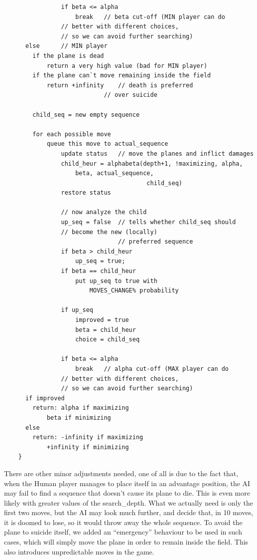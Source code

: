 {\begin{lstlisting}
                if beta <= alpha
                	break	// beta cut-off (MIN player can do
				// better with different choices,
				// so we can avoid further searching)
      else		// MIN player
      	if the plane is dead
        	return a very high value (bad for MIN player)
        if the plane can`t move remaining inside the field
        	return +infinity	// death is preferred
                			// over suicide
        
        child_seq = new empty sequence
        
        for each possible move
        	queue this move to actual_sequence
                update status	// move the planes and inflict damages
                child_heur = alphabeta(depth+1, !maximizing, alpha,
					beta, actual_sequence,
                                        child_seq)
                restore status
        	
                // now analyze the child
                up_seq = false	// tells whether child_seq should
				// become the new (locally)
                                // preferred sequence
                if beta > child_heur
                	up_seq = true;
                if beta == child_heur
                	put up_seq to true with
                        MOVES_CHANGE% probability
                        
                if up_seq
                	improved = true
                	beta = child_heur
                	choice = child_seq
                
                if beta <= alpha
                	break	// alpha cut-off (MAX player can do
				// better with different choices,
				// so we can avoid further searching)
      if improved
      	return:	alpha if maximizing
        	beta if minimizing
      else
      	return:	-infinity if maximizing
        	+infinity if minimizing
    }
  \end{lstlisting}
}

There are other minor adjustments needed, one of all is due to the fact that, when the Human player manages to place itself in an advantage position, the AI may fail to find a sequence that doesn't cause its plane to die. This is even more likely with greater values of the search\_depth. What we actually need is only the first two moves, but the AI may look much further, and decide that, in 10 moves, it is doomed to lose, so it would throw away the whole sequence.
To avoid the plane to suicide itself, we added an ``emergency'' behaviour to be used in such cases, which will simply move the plane in order to remain inside the field. This also introduces unpredictable moves in the game.
